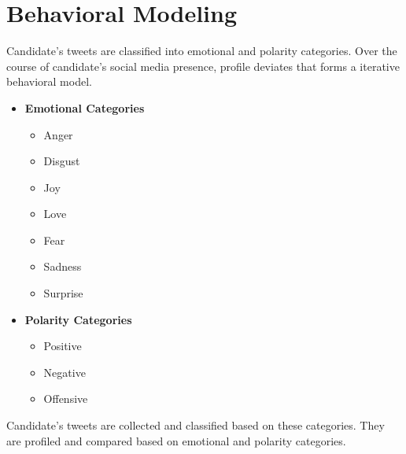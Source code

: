 \documentclass[oneside,a4paper,12pt]{pictreport}
\begin{document}
\section{Behavioral Modeling}
Candidate's tweets are classified into emotional and polarity categories. Over the course of candidate's social media presence, profile deviates that forms a iterative behavioral model.
\begin{itemize}
    \item \textbf{Emotional Categories}
    \begin{itemize}
        \item Anger
        \item Disgust
        \item Joy
        \item Love
        \item Fear
        \item Sadness
        \item Surprise
    \end{itemize}
    \item \textbf{Polarity Categories}
    \begin{itemize}
    \item Positive
    \item Negative
    \item Offensive
    \end{itemize}
\end{itemize}
Candidate's tweets are collected and classified based on these categories. They are profiled and compared based on emotional and polarity categories.
\newpage
\end{document}
